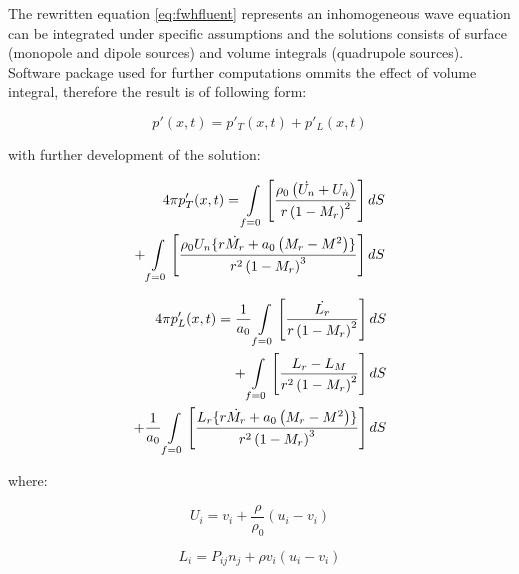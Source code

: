 The rewritten equation \ref{eq:fwhfluent} represents an inhomogeneous wave equation can be integrated under specific assumptions and the solutions consists of surface (monopole and dipole sources) and volume integrals (quadrupole sources). Software package used for further computations ommits the effect of volume integral, therefore the result is of following form:

\begin{equation} \label{eq:fwhfluentsolved}
p'(x, t) = p'_T(x, t) + p'_L(x, t)
\end{equation}

\noindent with further development of the solution:

\begin{equation} \label{eq:fwhfluentpt}
\begin{split}
4 \pi p'_T (x, t)
= \int\displaylimits_{f=0} \left[ \frac{ \rho_0 \left( \dot{U_n} + U_{\dot{n}} \right)}{r \left( 1 - M_{r} \right)^{2}} \right] dS \\
+ \int\displaylimits_{f=0} \left[ \frac{\rho_0 U_n \lbrace r \dot{M_r} + a_0 \left( M_r - M^2 \right) \rbrace}{r^2 \left( 1 - M_{r} \right)^{3}} \right] dS
\end{split}
\end{equation}

\begin{equation} \label{eq:fwhfluentpl}
\begin{split}
4 \pi p'_L (x, t)
= \frac{1}{a_0} \int\displaylimits_{f=0} \left[ \frac{\dot{L_r}}{r \left(1 - M_r \right)^2 }\right] dS \\
+ \int\displaylimits_{f=0} \left[ \frac{L_r - L_M}{r^2 \left( 1 - M_r \right)^2 } \right] dS \\
+ \frac{1}{a_0} \int\displaylimits_{f=0} \left[ \frac{L_r \lbrace r \dot{M_r} + a_0 \left( M_r - M^2 \right) \rbrace }{r^2 \left( 1 - M_r \right)^3 } \right] dS
\end{split}
\end{equation}

\noindent where:

\begin{equation} \label{eq:fwhfluentui}
U_i = v_i + \frac{\rho}{\rho_0}\left(u_i - v_i \right)
\end{equation}

\begin{equation} \label{eq:fwhfluentli}
L_i = P_{ij} n_j + \rho v_i \left(u_i - v_i \right)
\end{equation}

